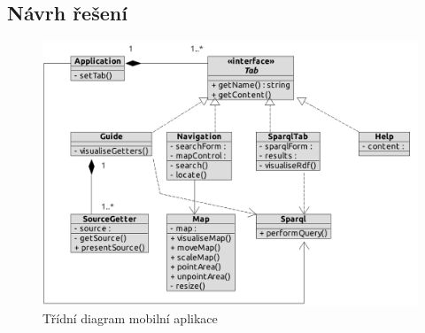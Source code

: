 \subsection{Návrh řešení}
\begin{figure}[h]
 \centering
 \includegraphics[width=14.30cm]{./figures/class-m.pdf}
 \caption{Třídní diagram mobilní aplikace}
 \label{fig:mobile:class}
\end{figure}





